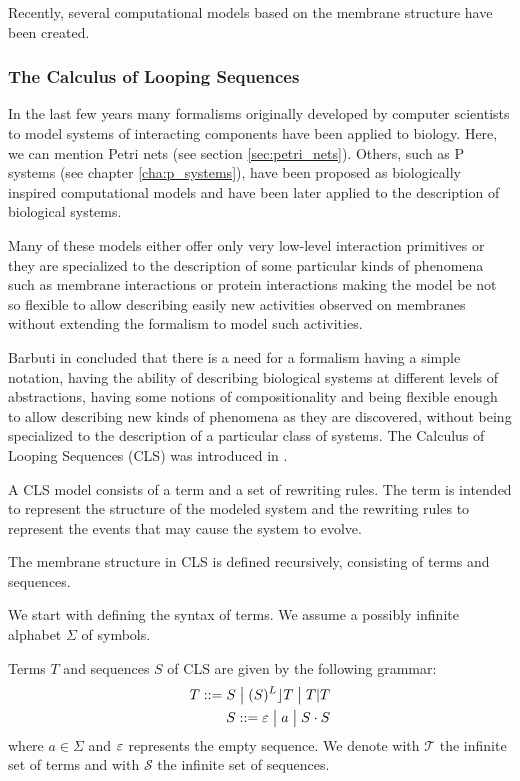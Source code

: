 
Recently, several computational models based on the membrane structure have been created.


\subsubsection{The Calculus of Looping Sequences} %
\label{subs:calculus_of_looping_sequences}

In the last few years many formalisms originally developed by computer scientists to model systems of interacting components have been applied to biology. Here, we can mention Petri nets (see section \ref{sec:petri_nets}). Others, such as P systems (see chapter \ref{cha:p_systems}), have been proposed as biologically inspired computational models and have been later applied to the description of biological systems.

Many of these models either offer only very low-level interaction primitives or they are specialized to the description of some particular kinds of phenomena such as membrane interactions or protein interactions making the model be not so flexible to allow describing easily new activities observed on membranes without extending the formalism to model such activities.

Barbuti in \cite{Barbuti07CLS} concluded that there is a need for a formalism having a simple notation, having the ability of describing biological systems at different levels of abstractions, having some notions of compositionality and being flexible enough to allow describing new kinds of phenomena as they are discovered, without being specialized to the description of a particular class of systems. The  Calculus of Looping Sequences (CLS) was introduced in \cite{Barbuti07CLS}.

A CLS model consists of a term and a set of rewriting rules. The term is intended to represent the structure of the modeled system and the rewriting rules to represent the events that may cause the system to evolve.

The membrane structure in CLS is defined recursively, consisting of terms and sequences.

We start with defining the syntax of terms. We assume a possibly infinite alphabet $\Sigma$ of symbols.

\begin{definition}
  Terms $T$ and sequences $S$ of CLS are given by the following grammar:
  \begin{align*}
    T ::= S \;\big|\; (S)^L\rfloor T \;\big|\; T|T\\
    S ::= \varepsilon \;\big|\; a \;\big|\; S\cdot S
  \end{align*}
  where $a\in \Sigma$ and $\varepsilon$ represents the empty sequence. We denote with $\mathcal T$ the infinite set of terms and with $\mathcal S$ the infinite set of sequences.
\end{definition}

